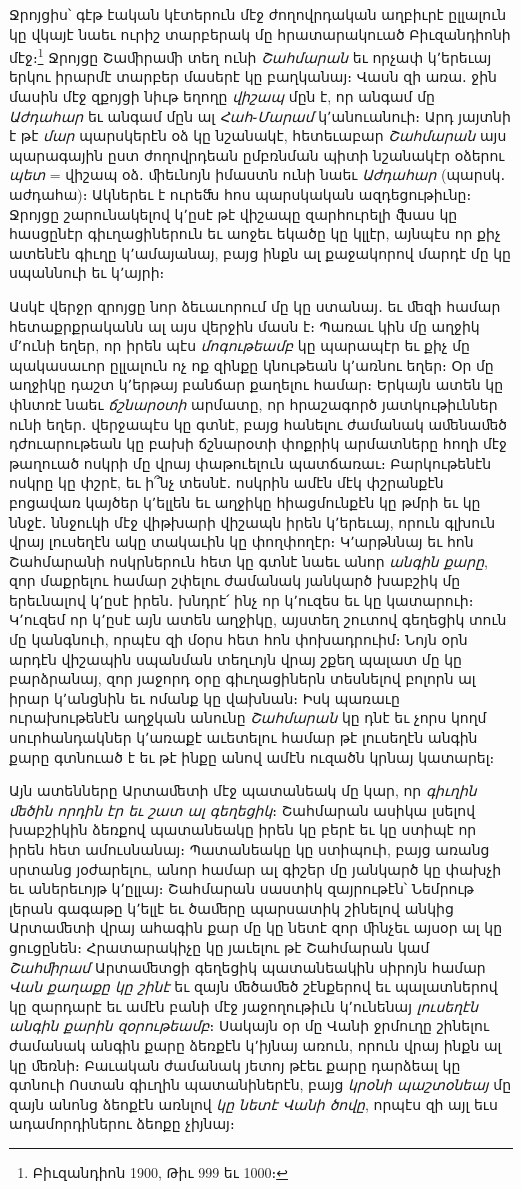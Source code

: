 \documentclass{article}
\begin{document}
{Ջրոյցիս՝ գէթ էական կէտերուն մէջ ժողովրդական աղբիւրէ ըլլալուն կը վկայէ նաեւ ուրիշ տարբերակ մը հրատարակուած Բիւզանդիոնի մէջ։\footnote{Բիւզանդիոն 1900, Թիւ 999 եւ 1000։} Ջրոյցը Շաﬕրաﬕ տեղ ունի \emph{Շահմարան} եւ որչափ կ՚երեւայ երկու իրարմէ տարբեր մասերէ կը բաղկանայ։ Վասն զի առա․ ջին մասին մէջ զքոյցի նիւթ եղողը \emph{վիշապ} մըն է, որ անգամ մը \emph{Աժդահար} եւ անգամ մըն ալ \emph{Հահ}֊\emph{Մարամ} կ՚անուանուի։ Արդ յայտնի է թէ \emph{մար} պարսկերէն օձ կը նշանակէ, հետեւաբար \emph{Շահմարան} այս պարագային ըստ ժողովրդեան ըմբռնման պիտի նշանակէր օձերու \emph{պետ} = վիշապ օձ․ ﬕեւնոյն իմաստն ունի նաեւ \emph{Աժդահար} (պարսկ․ աժդահա)։ Ակներեւ է ուրեﬓ հոս պարսկական ազդեցութիւնը։ Ջրոյցը շարունակելով կ՚ըսէ թէ վիշապը զարհուրելի ﬖաս կը հասցընէր գիւղացիներուն եւ աոջեւ եկածը կը կլլէր, այնպէս որ քիչ ատենէն գիւղը կ՚ամայանայ, բայց ինքն ալ քաջակորով մարդէ մը կը սպաննուի եւ կ՚այրի։

Ասկէ վերջր զրոյցը նոր ձեւաւորում մը կը ստանայ․ եւ ﬔզի համար հետաքրքրականն ալ այս վերջին մասն է։ Պառաւ կին մը աղջիկ մ՚ունի եղեր, որ իրեն պէս \emph{մոգութեամբ} կը պարապէր եւ քիչ մը պակասաւոր ըլլալուն ոչ ոք զինքը կնութեան կ՚առնու եղեր։ Օր մը աղջիկը դաշտ կ՚երթայ բանճար քաղելու համար։ Երկայն ատեն կը փնտռէ նաեւ \emph{ճշնարօտի} արմատը, որ հրաշագործ յատկութիւններ ունի եղեր․ վերջապէս կը գտնէ, բայց հանելու ժամանակ աﬔնաﬔծ դժուարութեան կը բախի ճշնարօտի փոքրիկ արմատները հողի մէջ թաղուած ոսկրի մը վրայ փաթուելուն պատճառաւ։ Բարկութենէն ոսկրը կը փշրէ, եւ ի՞նչ տեսնէ․ ոսկրին ամէն մէկ փշրանքէն բոցավառ կայծեր կ՚ելլեն եւ աղջիկը հիացմունքէն կը թմրի եւ կը ննջէ․ ննջուկի մէջ վիթխարի վիշապն իրեն կ՚երեւայ, որուն գլխուն վրայ լուսեղէն ակը տակաւին կը փողփողէր։ Կ՚արթննայ եւ հոն Շահմարանի ոսկրներուն հետ կը գտնէ նաեւ անոր \emph{անգին քարը}, զոր մաքրելու համար շփելու ժամանակ յանկարծ խաբշիկ մը երեւնալով կ՚ըսէ իրեն․ խնդրէ՛ ինչ որ կ՚ուզես եւ կը կատարուի։ Կ՚ուզեմ որ կ՚ըսէ այն ատեն աղջիկը, այստեղ շուտով գեղեցիկ տուն մը կանգնուի, որպէս զի մօրս հետ հոն փոխադրուիմ։ Նոյն օրն արդէն վիշապին սպանման տեղւոյն վրայ շքեղ պալատ մը կը բարձրանայ, զոր յաջորդ օրը գիւղացիներն տեսնելով բոլորն ալ իրար կ՚անցնին եւ ոմանք կը վախնան։ Իսկ պառաւը ուրախութենէն աղջկան անունը \emph{Շահմարան} կը դնէ եւ չորս կողմ սուրհանդակներ կ՚առաքէ աւետելու համար թէ լուսեղէն անգին քարը գտնուած է եւ թէ ինքը անով ամէն ուզածն կրնայ կատարել։

Այն ատենները Արտաﬔտի մէջ պատանեակ մը կար, որ \emph{գիւղին ﬔծին որդին էր եւ շատ ալ գեղեցիկ}։ Շահմարան ասիկա լսելով խաբշիկին ձեռքով պատանեակը իրեն կը բերէ եւ կը ստիպէ որ իրեն հետ ամուսնանայ։ Պատանեակը կը ստիպուի, բայց առանց սրտանց յօժարելու, անոր համար ալ գիշեր մը յանկարծ կը փախչի եւ աներեւոյթ կ՚ըլլայ։ Շահմարան սաստիկ զայրութէն՝ Նեմրութ լերան գագաթը կ՚ելլէ եւ ծաﬔրը պարսատիկ շինելով անկից Արտաﬔտի վրայ ահագին քար մը կը նետէ զոր ﬕնչեւ այսօր ալ կը ցուցընեն։ Հրատարակիչը կը յաւելու թէ Շահմարան կամ \emph{Շահﬕրամ} Արտաﬔտցի գեղեցիկ պատանեակին սիրոյն համար \emph{Վան քաղաքը կը շինէ} եւ զայն ﬔծաﬔծ շէնքերով եւ պալատներով կը զարդարէ եւ ամէն բանի մէջ յաջողութիւն կ՚ունենայ \emph{լուսեղէն անգին քարին զօրութեամբ}։ Սակայն օր մը Վանի ջրմուղը շինելու ժամանակ անգին քարը ձեռքէն կ՚իյնայ առուն, որուն վրայ ինքն ալ կը ﬔռնի։ Բաւական ժամանակ յետոյ թէեւ քարը դարձեալ կը գտնուի Ոստան գիւղին պատանիներէն, բայց \emph{կրօնի պաշտօնեայ} մը զայն անոնց ձեոքէն առնլով \emph{կը նետէ Վանի ծովը}, որպէս զի այլ եւս ադամորդիներու ձեոքը չիյնայ։

}
\end{document}
